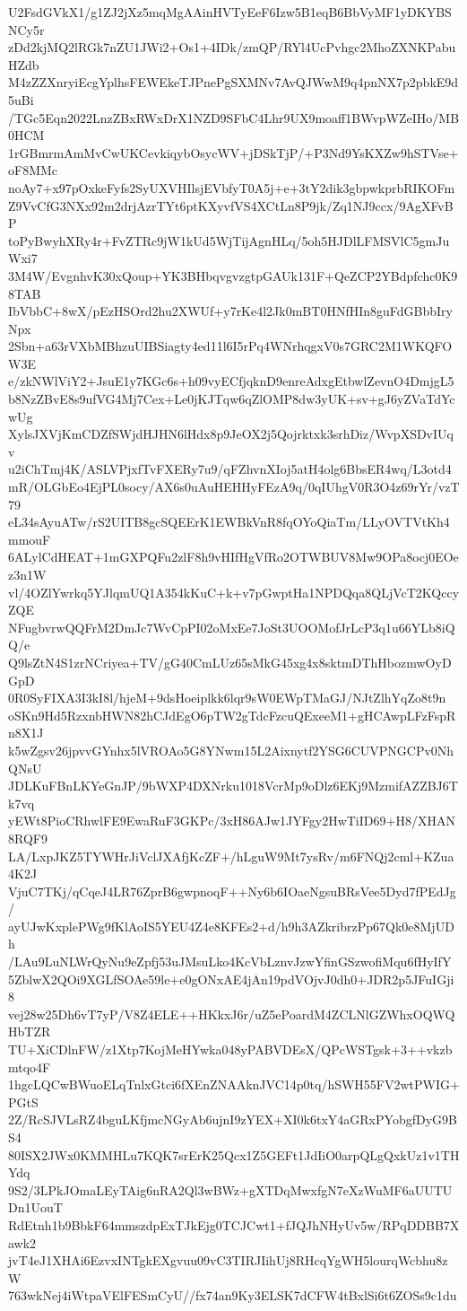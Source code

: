 U2FsdGVkX1/g1ZJ2jXz5mqMgAAinHVTyEeF6Izw5B1eqB6BbVyMF1yDKYBSNCy5r
zDd2kjMQ2lRGk7nZU1JWi2+Os1+4IDk/zmQP/RYl4UcPvhgc2MhoZXNKPabuHZdb
M4zZZXnryiEcgYplhsFEWEkeTJPnePgSXMNv7AvQJWwM9q4pnNX7p2pbkE9d5uBi
/TGc5Eqn2022LnzZBxRWxDrX1NZD9SFbC4Lhr9UX9moaff1BWvpWZeIHo/MB0HCM
1rGBmrmAmMvCwUKCevkiqybOsycWV+jDSkTjP/+P3Nd9YsKXZw9hSTVse+oF8MMc
noAy7+x97pOxkeFyfs2SyUXVHIlsjEVbfyT0A5j+e+3tY2dik3gbpwkprbRIKOFm
Z9VvCfG3NXx92m2drjAzrTYt6ptKXyvfVS4XCtLn8P9jk/Zq1NJ9ccx/9AgXFvBP
toPyBwyhXRy4r+FvZTRc9jW1kUd5WjTijAgnHLq/5oh5HJDlLFMSVlC5gmJuWxi7
3M4W/EvgnhvK30xQoup+YK3BHbqvgvzgtpGAUk131F+QeZCP2YBdpfchc0K98TAB
IbVbbC+8wX/pEzHSOrd2hu2XWUf+y7rKe4l2Jk0mBT0HNfHIn8guFdGBbbIryNpx
2Sbn+a63rVXbMBhzuUIBSiagty4ed11l6I5rPq4WNrhqgxV0s7GRC2M1WKQFOW3E
e/zkNWlViY2+JsuE1y7KGc6s+h09vyECfjqknD9enreAdxgEtbwlZevnO4DmjgL5
b8NzZBvE8s9ufVG4Mj7Cex+Le0jKJTqw6qZlOMP8dw3yUK+sv+gJ6yZVaTdYcwUg
XylsJXVjKmCDZfSWjdHJHN6lHdx8p9JeOX2j5Qojrktxk3srhDiz/WvpXSDvIUqv
u2iChTmj4K/ASLVPjxfTvFXERy7u9/qFZhvnXIoj5atH4olg6BbsER4wq/L3otd4
mR/OLGbEo4EjPL0socy/AX6s0uAuHEHHyFEzA9q/0qIUhgV0R3O4z69rYr/vzT79
eL34sAyuATw/rS2UITB8gcSQEErK1EWBkVnR8fqOYoQiaTm/LLyOVTVtKh4mmouF
6ALylCdHEAT+1mGXPQFu2zlF8h9vHIfHgVfRo2OTWBUV8Mw9OPa8ocj0EOez3n1W
vl/4OZlYwrkq5YJlqmUQ1A354kKuC+k+v7pGwptHa1NPDQqa8QLjVcT2KQccyZQE
NFugbvrwQQFrM2DmJc7WvCpPI02oMxEe7JoSt3UOOMofJrLcP3q1u66YLb8iQQ/e
Q9lsZtN4S1zrNCriyea+TV/gG40CmLUz65sMkG45xg4x8sktmDThHbozmwOyDGpD
0R0SyFIXA3I3kI8l/hjeM+9dsHoeiplkk6lqr9sW0EWpTMaGJ/NJtZlhYqZo8t9n
oSKn9Hd5RzxnbHWN82hCJdEgO6pTW2gTdcFzcuQExeeM1+gHCAwpLFzFspRn8X1J
k5wZgsv26jpvvGYnhx5lVROAo5G8YNwm15L2Aixnytf2YSG6CUVPNGCPv0NhQNsU
JDLKuFBnLKYeGnJP/9bWXP4DXNrku1018VcrMp9oDlz6EKj9MzmifAZZBJ6Tk7vq
yEWt8PioCRhwlFE9EwaRuF3GKPc/3xH86AJw1JYFgy2HwTiID69+H8/XHAN8RQF9
LA/LxpJKZ5TYWHrJiVclJXAfjKcZF+/hLguW9Mt7ysRv/m6FNQj2cml+KZua4K2J
VjuC7TKj/qCqeJ4LR76ZprB6gwpnoqF++Ny6b6IOaeNgsuBRsVee5Dyd7fPEdJg/
ayUJwKxplePWg9fKlAoIS5YEU4Z4e8KFEs2+d/h9h3AZkribrzPp67Qk0e8MjUDh
/LAu9LuNLWrQyNu9eZpfj53uJMsuLko4KcVbLznvJzwYfinGSzwofiMqu6fHyIfY
5ZblwX2QOi9XGLfSOAe59le+e0gONxAE4jAn19pdVOjvJ0dh0+JDR2p5JFuIGji8
vej28w25Dh6vT7yP/V8Z4ELE++HKkxJ6r/uZ5ePoardM4ZCLNlGZWhxOQWQHbTZR
TU+XiCDlnFW/z1Xtp7KojMeHYwka048yPABVDEsX/QPcWSTgsk+3++vkzbmtqo4F
1hgcLQCwBWuoELqTnlxGtci6fXEnZNAAknJVC14p0tq/hSWH55FV2wtPWIG+PGtS
2Z/RcSJVLsRZ4bguLKfjmcNGyAb6ujnI9zYEX+XI0k6txY4aGRxPYobgfDyG9BS4
80ISX2JWx0KMMHLu7KQK7srErK25Qcx1Z5GEFt1JdIiO0arpQLgQxkUz1v1THYdq
9S2/3LPkJOmaLEyTAig6nRA2Ql3wBWz+gXTDqMwxfgN7eXzWuMF6aUUTUDn1UouT
RdEtnh1b9BbkF64mmszdpExTJkEjg0TCJCwt1+fJQJhNHyUv5w/RPqDDBB7Xawk2
jvT4eJ1XHAi6EzvxINTgkEXgvuu09vC3TIRJIihUj8RHcqYgWH5lourqWcbhu8zW
763wkNej4iWtpaVElFESmCyU//fx74an9Ky3ELSK7dCFW4tBxlSi6t6ZOSs9c1du
